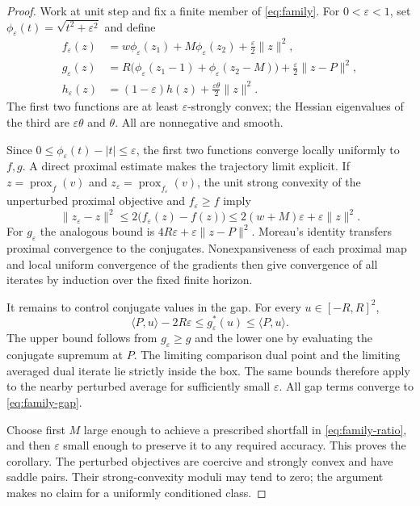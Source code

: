 \documentclass[11pt,a4paper]{article}
\theoremstyle{remark}\newtheorem{remark}[theorem]{Remark}
\DeclareMathOperator{\prox}{prox}
\newcommand{\ip}[2]{\langle #1,#2\rangle}
\newcommand{\norm}[1]{\lVert #1\rVert}
\begin{document}
\begin{proof}
Work at unit step and fix a finite member of \eqref{eq:family}. For $0<\varepsilon<1$, set $\phi_\varepsilon(t)=\sqrt{t^2+\varepsilon^2}$ and define
\begin{align*}
f_\varepsilon(z)&=w\phi_\varepsilon(z_1)+M\phi_\varepsilon(z_2)+\tfrac\varepsilon2\norm z^2,\\
g_\varepsilon(z)&=R\bigl(\phi_\varepsilon(z_1-1)+\phi_\varepsilon(z_2-M)\bigr)
+\tfrac\varepsilon2\norm{z-P}^2,\\
h_\varepsilon(z)&=(1-\varepsilon)h(z)+\tfrac{\varepsilon\theta}{2}\norm z^2.
\end{align*}
The first two functions are at least $\varepsilon$-strongly convex; the Hessian eigenvalues of the third are $\varepsilon\theta$ and $\theta$. All are nonnegative and smooth.

Since $0\le\phi_\varepsilon(t)-|t|\le\varepsilon$, the first two functions converge locally uniformly to $f,g$. A direct proximal estimate makes the trajectory limit explicit. If $z=\prox_f(v)$ and $z_\varepsilon=\prox_{f_\varepsilon}(v)$, the unit strong convexity of the unperturbed proximal objective and $f_\varepsilon\ge f$ imply
\[
\norm{z_\varepsilon-z}^2\le2\bigl(f_\varepsilon(z)-f(z)\bigr)
\le2(w+M)\varepsilon+\varepsilon\norm z^2.
\]
For $g_\varepsilon$ the analogous bound is $4R\varepsilon+\varepsilon\norm{z-P}^2$. Moreau's identity transfers proximal convergence to the conjugates. Nonexpansiveness of each proximal map and local uniform convergence of the gradients then give convergence of all iterates by induction over the fixed finite horizon.

It remains to control conjugate values in the gap. For every $u\in[-R,R]^2$,
\[
\ip P{u}-2R\varepsilon\le g_\varepsilon^*(u)\le\ip P{u}.
\]
The upper bound follows from $g_\varepsilon\ge g$ and the lower one by evaluating the conjugate supremum at $P$. The limiting comparison dual point and the limiting averaged dual iterate lie strictly inside the box. The same bounds therefore apply to the nearby perturbed average for sufficiently small $\varepsilon$. All gap terms converge to \eqref{eq:family-gap}.

Choose first $M$ large enough to achieve a prescribed shortfall in \eqref{eq:family-ratio}, and then $\varepsilon$ small enough to preserve it to any required accuracy. This proves the corollary. The perturbed objectives are coercive and strongly convex and have saddle pairs. Their strong-convexity moduli may tend to zero; the argument makes no claim for a uniformly conditioned class.
\end{proof}
\end{document}
